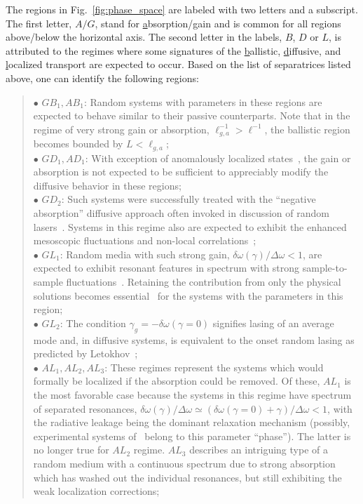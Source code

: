 The regions in Fig.~\ref{fig:phase_space} are labeled with two letters and a subscript. The first letter, $A/G$, stand for {\underline a}bsorption/{\underline g}ain and is common for all regions above/below the horizontal axis. The second letter in the labels, $B$, $D$ or $L$, is attributed to the regimes where some signatures of the {\underline b}allistic, {\underline d}iffusive, and {\underline l}ocalized transport are expected to occur. Based on the list of separatrices listed above, one can identify the following regions:
\begin{quote}
$\bullet$ $GB_1,AB_1$: Random systems with parameters in these regions are expected to behave similar to their passive counterparts. Note that in the regime of very strong gain or absorption, $\ell_{g,a}^{-1}>\ell^{-1}$, the ballistic region becomes bounded by $L<\ell_{g,a}$;\\
$\bullet$ $GD_1,AD_1$: With exception of anomalously localized states~\cite{1991_Altshuler,1995_Muzykantskii_ALS,2000_Mirlin,2000_Cao_localization,2002_Apalkov_ALS,2004_Burin_ALS}, the gain or absorption is not expected to be sufficient to appreciably modify the diffusive behavior in these regions; \\
$\bullet$ $GD_2$: Such systems were successfully treated with the ``negative absorption'' diffusive approach often invoked in discussion of random lasers~\cite{1968_Letokhov,1994_lawandy_nature,1996_John_RandLaser,1996_Wiersma_RandomLaser,1996_Genack_DiffRandomLaser,
1999_Cao_RandomLaserPRL,1999_Vardeny_PolymerRandomLaser,2001_vansoest_thesis,2004_Florescu}. Systems in this regime also are expected to exhibit the enhanced mesoscopic fluctuations and non-local correlations~\cite{2005_Yamilov_correlations,2004_Yamilov_intensity,2006_Yamilov_conductance};\\
$\bullet$ $GL_1$: Random media with such strong gain, $\delta\omega(\gamma)/\Delta\omega<1$, are expected to exhibit resonant features in spectrum with strong sample-to-sample fluctuations~\cite{1995_zyuzin_fluctuations,1997_Burkov_Zyuzin}. Retaining the contribution from only the physical solutions becomes essential~\cite{1999_Jiang,2002_Zhang_phys_solutions} for the systems with the parameters in this region;\\
$\bullet$ $GL_2$: The condition $\gamma_g=-\delta\omega(\gamma =0)$ signifies lasing of an average mode and, in diffusive systems, is equivalent to the onset random lasing as predicted by Letokhov~\cite{1968_Letokhov}; \\
$\bullet$ $AL_1,AL_2,AL_3$: These regimes represent the systems which would formally be localized if the absorption could be removed. Of these, $AL_1$ is the most favorable case because the systems in this regime have spectrum of separated resonances, $\delta\omega(\gamma)/\Delta\omega\simeq(\delta\omega(\gamma=0)+\gamma)/\Delta\omega<1$, with the radiative leakage being the dominant relaxation mechanism (possibly, experimental systems of~\cite{2000_chabanov_nature} belong to this parameter ``phase''). The latter is no longer true for $AL_2$ regime. $AL_3$ describes an intriguing type of a random medium with a continuous spectrum due to strong absorption which has washed out the individual resonances, but still exhibiting the weak localization corrections;\\

\end{quote}
